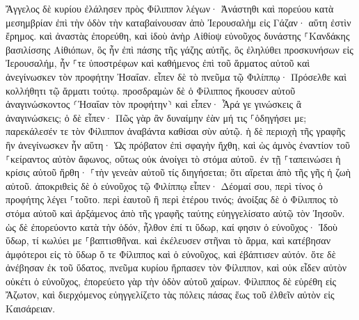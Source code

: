\documentclass[twoside, 9pt]{extreport}
\begin{document}
Ἄγγελος δὲ κυρίου ἐλάλησεν πρὸς Φίλιππον λέγων· Ἀνάστηθι καὶ πορεύου κατὰ μεσημβρίαν ἐπὶ τὴν ὁδὸν τὴν καταβαίνουσαν ἀπὸ Ἰερουσαλὴμ εἰς Γάζαν· αὕτη ἐστὶν ἔρημος. 
καὶ ἀναστὰς ἐπορεύθη, καὶ ἰδοὺ ἀνὴρ Αἰθίοψ εὐνοῦχος δυνάστης ⸀Κανδάκης βασιλίσσης Αἰθιόπων, ὃς ἦν ἐπὶ πάσης τῆς γάζης αὐτῆς, ὃς ἐληλύθει προσκυνήσων εἰς Ἰερουσαλήμ, 
ἦν ⸀τε ὑποστρέφων καὶ καθήμενος ἐπὶ τοῦ ἅρματος αὐτοῦ καὶ ἀνεγίνωσκεν τὸν προφήτην Ἠσαΐαν. 
εἶπεν δὲ τὸ πνεῦμα τῷ Φιλίππῳ· Πρόσελθε καὶ κολλήθητι τῷ ἅρματι τούτῳ. 
προσδραμὼν δὲ ὁ Φίλιππος ἤκουσεν αὐτοῦ ἀναγινώσκοντος ⸂Ἠσαΐαν τὸν προφήτην⸃ καὶ εἶπεν· Ἆρά γε γινώσκεις ἃ ἀναγινώσκεις; 
ὁ δὲ εἶπεν· Πῶς γὰρ ἂν δυναίμην ἐὰν μή τις ⸀ὁδηγήσει με; παρεκάλεσέν τε τὸν Φίλιππον ἀναβάντα καθίσαι σὺν αὐτῷ. 
ἡ δὲ περιοχὴ τῆς γραφῆς ἣν ἀνεγίνωσκεν ἦν αὕτη· Ὡς πρόβατον ἐπὶ σφαγὴν ἤχθη, καὶ ὡς ἀμνὸς ἐναντίον τοῦ ⸀κείραντος αὐτὸν ἄφωνος, οὕτως οὐκ ἀνοίγει τὸ στόμα αὐτοῦ. 
ἐν τῇ ⸀ταπεινώσει ἡ κρίσις αὐτοῦ ἤρθη· ⸀τὴν γενεὰν αὐτοῦ τίς διηγήσεται; ὅτι αἴρεται ἀπὸ τῆς γῆς ἡ ζωὴ αὐτοῦ. 
ἀποκριθεὶς δὲ ὁ εὐνοῦχος τῷ Φιλίππῳ εἶπεν· Δέομαί σου, περὶ τίνος ὁ προφήτης λέγει ⸀τοῦτο. περὶ ἑαυτοῦ ἢ περὶ ἑτέρου τινός; 
ἀνοίξας δὲ ὁ Φίλιππος τὸ στόμα αὐτοῦ καὶ ἀρξάμενος ἀπὸ τῆς γραφῆς ταύτης εὐηγγελίσατο αὐτῷ τὸν Ἰησοῦν. 
ὡς δὲ ἐπορεύοντο κατὰ τὴν ὁδόν, ἦλθον ἐπί τι ὕδωρ, καί φησιν ὁ εὐνοῦχος· Ἰδοὺ ὕδωρ, τί κωλύει με ⸀βαπτισθῆναι. 
καὶ ἐκέλευσεν στῆναι τὸ ἅρμα, καὶ κατέβησαν ἀμφότεροι εἰς τὸ ὕδωρ ὅ τε Φίλιππος καὶ ὁ εὐνοῦχος, καὶ ἐβάπτισεν αὐτόν. 
ὅτε δὲ ἀνέβησαν ἐκ τοῦ ὕδατος, πνεῦμα κυρίου ἥρπασεν τὸν Φίλιππον, καὶ οὐκ εἶδεν αὐτὸν οὐκέτι ὁ εὐνοῦχος, ἐπορεύετο γὰρ τὴν ὁδὸν αὐτοῦ χαίρων. 
Φίλιππος δὲ εὑρέθη εἰς Ἄζωτον, καὶ διερχόμενος εὐηγγελίζετο τὰς πόλεις πάσας ἕως τοῦ ἐλθεῖν αὐτὸν εἰς Καισάρειαν. 
\end{document}
